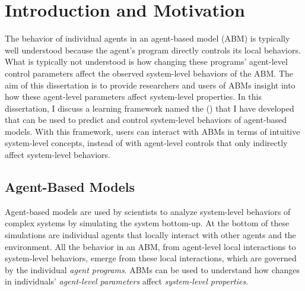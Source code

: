 \chapter{Introduction and Motivation}
\thispagestyle{plain}

\label{Introduction and Motivation}

The behavior of individual agents in an agent-based model (ABM) is typically well understood because the agent's program directly controls its local behaviors.
What is typically not understood is how changing these programs' agent-level control parameters affect the observed system-level behaviors of the ABM.
The aim of this dissertation is to provide researchers and users of ABMs insight into how these agent-level parameters affect system-level properties.
In this dissertation, I discuss a learning framework named the \framework (\fw) that I have developed that can be used to predict and control system-level behaviors of agent-based models.
With this framework, users can interact with ABMs in terms of intuitive system-level concepts, instead of with agent-level controls that only indirectly affect system-level behaviors.


\section{Agent-Based Models}



Agent-based models are used by scientists to analyze system-level behaviors of complex systems by simulating the system bottom-up.
At the bottom of these simulations are individual agents that locally interact with other agents and the environment.
All the behavior in an ABM, from agent-level local interactions to system-level behaviors, emerge from these local interactions, which are governed by the individual \textit{agent programs}.
ABMs can be used to understand how changes in individuals' \textit{agent-level parameters} affect \textit{system-level properties}.

